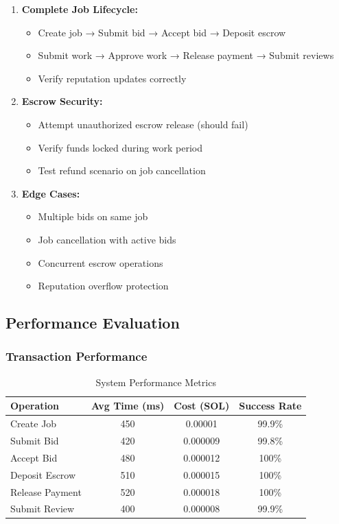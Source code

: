 \documentclass[a4paper,13pt,twoside]{report}
\theoremstyle{definition}
\begin{document}
\begin{enumerate}
    \item \textbf{Complete Job Lifecycle:}
    \begin{itemize}
        \item Create job → Submit bid → Accept bid → Deposit escrow
        \item Submit work → Approve work → Release payment → Submit reviews
        \item Verify reputation updates correctly
    \end{itemize}

    \item \textbf{Escrow Security:}
    \begin{itemize}
        \item Attempt unauthorized escrow release (should fail)
        \item Verify funds locked during work period
        \item Test refund scenario on job cancellation
    \end{itemize}

    \item \textbf{Edge Cases:}
    \begin{itemize}
        \item Multiple bids on same job
        \item Job cancellation with active bids
        \item Concurrent escrow operations
        \item Reputation overflow protection
    \end{itemize}
\end{enumerate}

\subsection{Performance Evaluation}

\subsubsection{Transaction Performance}

\begin{table}[h]
\centering
\caption{System Performance Metrics}
\begin{tabular}{|l|c|c|c|}
\hline
\textbf{Operation} & \textbf{Avg Time (ms)} & \textbf{Cost (SOL)} & \textbf{Success Rate} \\
\hline
Create Job & 450 & 0.00001 & 99.9\% \\
Submit Bid & 420 & 0.000009 & 99.8\% \\
Accept Bid & 480 & 0.000012 & 100\% \\
Deposit Escrow & 510 & 0.000015 & 100\% \\
Release Payment & 520 & 0.000018 & 100\% \\
Submit Review & 400 & 0.000008 & 99.9\% \\
\hline
\end{tabular}
\end{table}
\end{document}
